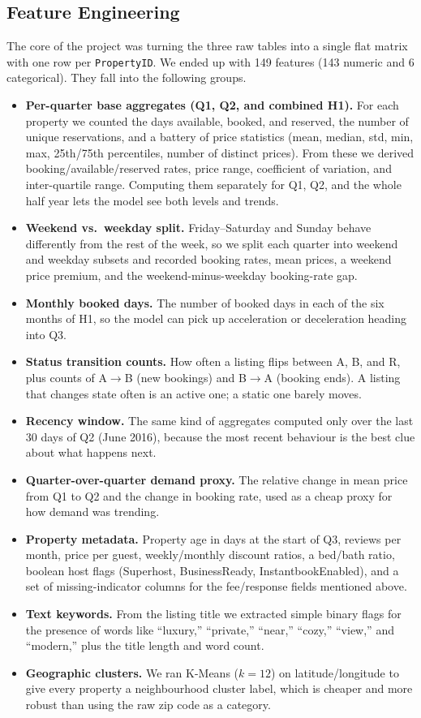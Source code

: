 \documentclass[journal]{IEEEtran}
\begin{document}
\subsection{Feature Engineering}
The core of the project was turning the three raw tables into a single flat
matrix with one row per \texttt{PropertyID}. We ended up with 149 features (143
numeric and 6 categorical). They fall into the following groups.
\begin{itemize}
\item \textbf{Per-quarter base aggregates (Q1, Q2, and combined H1).} For each
property we counted the days available, booked, and reserved, the number of
unique reservations, and a battery of price statistics (mean, median, std, min,
max, 25th/75th percentiles, number of distinct prices). From these we derived
booking/available/reserved rates, price range, coefficient of variation, and
inter-quartile range. Computing them separately for Q1, Q2, and the whole half
year lets the model see both levels and trends.
\item \textbf{Weekend vs.\ weekday split.} Friday--Saturday and Sunday behave
differently from the rest of the week, so we split each quarter into weekend and
weekday subsets and recorded booking rates, mean prices, a weekend price
premium, and the weekend-minus-weekday booking-rate gap.
\item \textbf{Monthly booked days.} The number of booked days in each of the six
months of H1, so the model can pick up acceleration or deceleration heading into
Q3.
\item \textbf{Status transition counts.} How often a listing flips between A, B,
and R, plus counts of A$\to$B (new bookings) and B$\to$A (booking ends). A
listing that changes state often is an active one; a static one barely moves.
\item \textbf{Recency window.} The same kind of aggregates computed only over
the last 30 days of Q2 (June 2016), because the most recent behaviour is the
best clue about what happens next.
\item \textbf{Quarter-over-quarter demand proxy.} The relative change in mean
price from Q1 to Q2 and the change in booking rate, used as a cheap proxy for how
demand was trending.
\item \textbf{Property metadata.} Property age in days at the start of Q3,
reviews per month, price per guest, weekly/monthly discount ratios, a bed/bath
ratio, boolean host flags (Superhost, BusinessReady, InstantbookEnabled), and a
set of missing-indicator columns for the fee/response fields mentioned above.
\item \textbf{Text keywords.} From the listing title we extracted simple binary
flags for the presence of words like ``luxury,'' ``private,'' ``near,''
``cozy,'' ``view,'' and ``modern,'' plus the title length and word count.
\item \textbf{Geographic clusters.} We ran K-Means ($k=12$) on
latitude/longitude to give every property a neighbourhood cluster label, which
is cheaper and more robust than using the raw zip code as a category.
\end{itemize}
\end{document}
